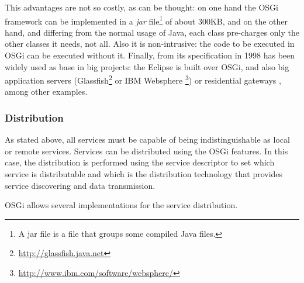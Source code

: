 This advantages are not so
                               costly, as can be thought: on one hand the OSGi
                                framework can be implemented in a
                                {\em jar} file\footnote{A jar file is
                                a file that groups some compiled Java
                                files.} of about 300KB, and on the other hand, and differing from
                                the normal usage of Java, each
                                class pre-charges only the other
                                classes it needs, not all. Also it is
                                non-intrusive: the code to be
                                executed in OSGi can be executed
                                without it. Finally, from its
                                specification in 1998 has been widely
                                used as base in big projects: the
                                Eclipse  is built over OSGi, and
                                also big application servers
                               (Glassfish\footnote{\url{http://glassfish.java.net}} 
                               or IBM Websphere \footnote{\url{http://www.ibm.com/software/websphere/}}) or
                               residential gateways
                               \cite{GarciaSanchez2013Gateway}, among other
                               examples. 



\subsubsection{Distribution}
As stated above, all services must be capable of being indistinguishable as local or remote services. Services can be distributed using the OSGi features. In this case, the distribution is performed using the service descriptor to set which service is distributable and which is the distribution technology that provides service discovering and data transmission.

OSGi allows several implementations for the service distribution. 

